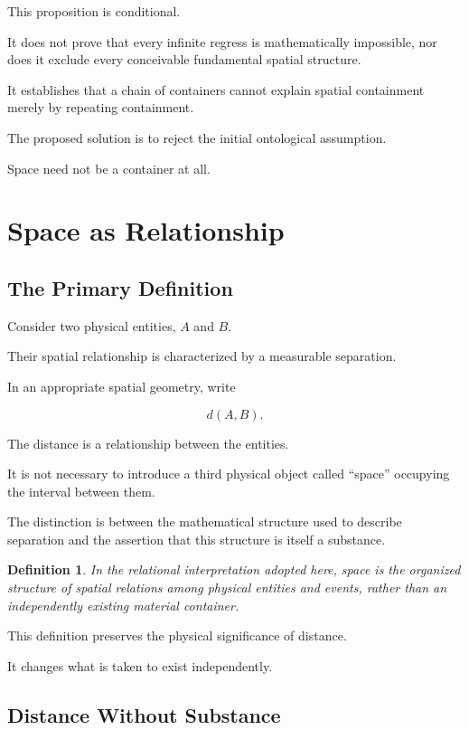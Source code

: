 \documentclass[12pt,onecolumn]{article}
\newtheorem{definition}{Definition}
\begin{document}
This proposition is conditional.

It does not prove that every infinite regress
is mathematically impossible, nor does it
exclude every conceivable fundamental spatial
structure.

It establishes that a chain of containers
cannot explain spatial containment merely
by repeating containment.

The proposed solution is to reject the initial
ontological assumption.

Space need not be a container at all.

\section{Space as Relationship}

\subsection{The Primary Definition}

Consider two physical entities, $A$ and $B$.

Their spatial relationship is characterized
by a measurable separation.

In an appropriate spatial geometry, write

\begin{equation}
d(A,B).
\end{equation}

The distance is a relationship between
the entities.

It is not necessary to introduce a third
physical object called ``space'' occupying
the interval between them.

The distinction is between the mathematical
structure used to describe separation and
the assertion that this structure is itself
a substance.

\begin{definition}
In the relational interpretation adopted here,
space is the organized structure of spatial
relations among physical entities and events,
rather than an independently existing material
container.
\end{definition}

This definition preserves the physical
significance of distance.

It changes what is taken to exist independently.

\subsection{Distance Without Substance}
\end{document}
